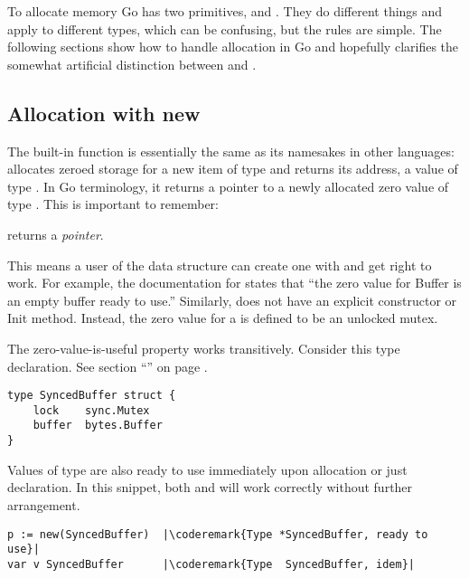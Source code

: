 To allocate memory Go has two primitives,  and . They do different
things and apply to different types, which can be confusing, but the
rules are simple.
The following sections show how to handle allocation
in Go and hopefully clarifies the somewhat artificial distinction between
 and . 

\subsection{Allocation with new}
\label{sec:allocation with new}
The built-in function  is 
essentially the same as its namesakes in other languages: 
allocates zeroed storage for a new item of type  and returns its
address, a value of type . In Go terminology, it returns a pointer to
a newly allocated zero value of type . This is important to
remember:
\begin{lbar}[]
 returns a \emph{pointer}.
\end{lbar}

This
means a user of the data structure can create one with  and get
right to work. For example, the documentation for  states
that ``the zero value for Buffer is an empty buffer ready to use.''
Similarly,  does not have an explicit constructor or Init
method. Instead, the zero value for a  is defined to be an
unlocked mutex.

The zero-value-is-useful property works transitively. Consider this type
declaration. See section ``'' on page
\pageref{sec:defining your own}.

\begin{lstlisting}
type SyncedBuffer struct {
    lock    sync.Mutex
    buffer  bytes.Buffer
}
\end{lstlisting}
Values of type  are also ready to use immediately upon
allocation or just declaration. In this snippet, both  and
 will work
correctly without further arrangement.
\begin{lstlisting}
p := new(SyncedBuffer)  |\coderemark{Type *SyncedBuffer, ready to use}|
var v SyncedBuffer      |\coderemark{Type  SyncedBuffer, idem}|
\end{lstlisting}

